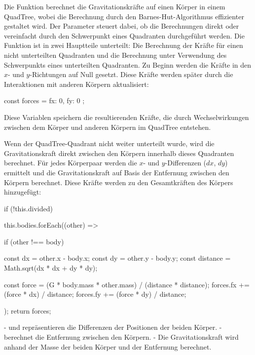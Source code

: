 \documentclass[a4paper,12pt,twoside]{article}
\begin{document}
Die Funktion  berechnet die Gravitationskräfte auf einen Körper  in einem QuadTree, wobei die Berechnung durch den Barnes-Hut-Algorithmus effizienter gestaltet wird. Der Parameter  steuert dabei, ob die Berechnungen direkt oder vereinfacht durch den Schwerpunkt eines Quadranten durchgeführt werden. Die Funktion ist in zwei Hauptteile unterteilt: Die Berechnung der Kräfte für einen nicht unterteilten Quadranten und die Berechnung unter Verwendung des Schwerpunkts eines unterteilten Quadranten.
Zu Beginn werden die Kräfte in den \( x \)- und \( y \)-Richtungen auf Null gesetzt. Diese Kräfte werden später durch die Interaktionen mit anderen Körpern aktualisiert:

\begin{javascript}
const forces = { fx: 0, fy: 0 };
\end{javascript}

Diese Variablen speichern die resultierenden Kräfte, die durch Wechselwirkungen zwischen dem Körper und anderen Körpern im QuadTree entstehen.

Wenn der QuadTree-Quadrant nicht weiter unterteilt wurde, wird die Gravitationskraft direkt zwischen den Körpern innerhalb dieses Quadranten berechnet. Für jedes Körperpaar werden die \( x \)- und \( y \)-Differenzen (\( dx \), \( dy \)) ermittelt und die Gravitationskraft auf Basis der Entfernung zwischen den Körpern berechnet. Diese Kräfte werden zu den Gesamtkräften des Körpers hinzugefügt:

\begin{javascript}
if (!this.divided) {
    this.bodies.forEach((other) => {
        if (other !== body) {
            const dx = other.x - body.x;
            const dy = other.y - body.y;
            const distance = Math.sqrt(dx * dx + dy * dy);
            
            const force = (G * body.mass * other.mass) / (distance * distance);
            forces.fx += (force * dx) / distance;
            forces.fy += (force * dy) / distance;
        }
    });
    return forces;
}
\end{javascript}

-  und  repräsentieren die Differenzen der Positionen der beiden Körper.
-  berechnet die Entfernung zwischen den Körpern.
- Die Gravitationskraft  wird anhand der Masse der beiden Körper und der Entfernung berechnet.
\end{document}
